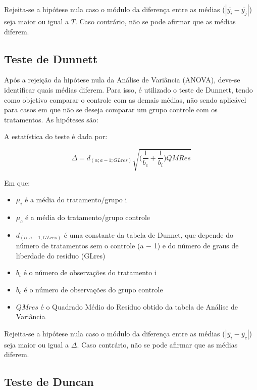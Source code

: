 \documentclass[
]{estat/estat}
\begin{document}
Rejeita-se a hipótese nula caso o módulo da diferença entre as médias
(\(|\bar{y_i} - \bar{y_j}|\)) seja maior ou igual a \(T\). Caso
contrário, não se pode afirmar que as médias diferem.

\hypertarget{teste-de-dunnett}{%
\subsection{Teste de Dunnett}\label{teste-de-dunnett}}

Após a rejeição da hipótese nula da Análise de Variância (ANOVA),
deve-se identificar quais médias diferem. Para isso, é utilizado o teste
de Dunnett, tendo como objetivo comparar o controle com as demais
médias, não sendo aplicável para casos em que não se deseja comparar um
grupo controle com os tratamentos. As hipóteses são:


A estatística do teste é dada por:

\[\Delta = d_{(\alpha;a-1;GLres)} \sqrt{\Big( \frac{1}{b_c} + \frac{1}{b_i} \Big) QMRes}\]

Em que:

\begin{itemize}
\item
  \(\mu_i\) é a média do tratamento/grupo i
\item
  \(\mu_c\) é a média do tratamento/grupo controle
\item
  \(d_{(\alpha;a-1;GLres)}\) é uma constante da tabela de Dunnet, que
  depende do número de tratamentos sem o controle (a − 1) e do número de
  graus de liberdade do resíduo (GLres)
\item
  \(b_i\) é o número de observações do tratamento i
\item
  \(b_c\) é o número de observações do grupo controle
\item
  \(QMres\) é o Quadrado Médio do Resíduo obtido da tabela de Análise de
  Variância
\end{itemize}

Rejeita-se a hipótese nula caso o módulo da diferença entre as médias
(\(|\bar{y_i} - \bar{y_c}|\)) seja maior ou igual a \(\Delta\). Caso
contrário, não se pode afirmar que as médias diferem.

\hypertarget{teste-de-duncan}{%
\subsection{Teste de Duncan}\label{teste-de-duncan}}
\end{document}
